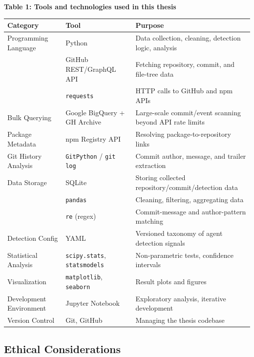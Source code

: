 \documentclass[11pt,a4paper]{article}
\begin{document}
\begin{center}
\textbf{Table 1: Tools and technologies used in this thesis}\label{tab:tools}\\[4pt]
\begin{tabular}{@{}p{3.2cm}p{3.2cm}p{7cm}@{}}
\toprule
\textbf{Category} & \textbf{Tool} & \textbf{Purpose} \\
\midrule
Programming Language & Python & Data collection, cleaning, detection logic, analysis \\
\addlinespace
\multirow{2}{*}{Data Collection} & GitHub REST/GraphQL API & Fetching repository, commit, and file-tree data \\
 & \texttt{requests} & HTTP calls to GitHub and npm APIs \\
\addlinespace
Bulk Querying & Google BigQuery + GH Archive & Large-scale commit/event scanning beyond API rate limits \\
\addlinespace
Package Metadata & npm Registry API & Resolving package-to-repository links \\
\addlinespace
Git History Analysis & \texttt{GitPython} / \texttt{git log} & Commit author, message, and trailer extraction \\
\addlinespace
Data Storage & SQLite & Storing collected repository/commit/detection data \\
\addlinespace
\multirow{2}{*}{Data Processing} & \texttt{pandas} & Cleaning, filtering, aggregating data \\
 & \texttt{re} (regex) & Commit-message and author-pattern matching \\
\addlinespace
Detection Config & YAML & Versioned taxonomy of agent detection signals \\
\addlinespace
Statistical Analysis & \texttt{scipy.stats}, \texttt{statsmodels} & Non-parametric tests, confidence intervals \\
\addlinespace
Visualization & \texttt{matplotlib}, \texttt{seaborn} & Result plots and figures \\
\addlinespace
Development Environment & Jupyter Notebook & Exploratory analysis, iterative development \\
\addlinespace
Version Control & Git, GitHub & Managing the thesis codebase \\
\bottomrule
\end{tabular}
\end{center}

\newpage


\subsection{Ethical Considerations}
\end{document}
